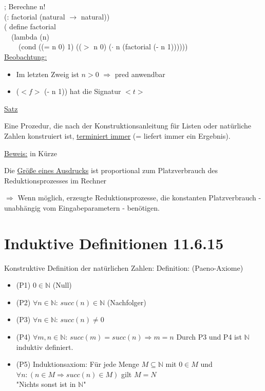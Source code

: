 \documentclass[a4paper, 20pt, openany]{book}
\begin{document}
; Berechne n! \\
(: factorial (natural $\rightarrow$ natural)) \\
( define factorial \\
\ \ (lambda (n)  \\
\ \ \ \ (cond ((= n 0) 1) (($>$ n 0) ($\cdot$ n (factorial (- n 1)))))) \\

\underline{Beobachtung:}

\begin{itemize}
  \item Im letzten Zweig ist $n>0$ $\Rightarrow$ pred anwendbar 
  \item ($<f>$ (- n 1)) hat die Signatur $<t>$
\end{itemize}

\underline{Satz}

Eine Prozedur, die nach der Konstruktionsanleitung für Listen oder natürliche Zahlen konstruiert ist, \underline{terminiert immer} (= liefert immer ein Ergebnis).

\underline{Beweis:} in Kürze

Die \underline{Größe eines Ausdrucks} ist proportional zum Platzverbrauch des Reduktionsprozesses im Rechner

$\Rightarrow$ Wenn möglich, erzeugte Reduktionsprozesse, die konstanten Platzverbrauch - unabhängig vom Eingabeparametern - benötigen.




\chapter{Induktive Definitionen 11.6.15}
Konstruktive Definition der natürlichen Zahlen:
Definition: (Paeno-Axiome)\\
\begin{itemize}
\item (P1) $0 \in \mathbb{N}$							(Null)
\item (P2) $\forall n \in \mathbb{N}$: $succ(n) \in \mathbb{N}$ (Nachfolger)
\item (P3) $\forall n \in \mathbb{N}$: $succ(n) \ne 0$
\item (P4) $\forall m,n \in \mathbb{N}$: $succ(m) = succ(n) \Rightarrow m = n$
Durch P3 und P4 ist $\mathbb{N}$ induktiv definiert.
\item (P5) Induktionsaxiom: Für jede Menge $M \subseteq \mathbb{N}$ mit $0 \in M$ und $\forall n: (n \in M \Rightarrow succ(n) \in M)$ gilt $M =N$\\
"Nichts sonst ist in $\mathbb{N}$"
\end{itemize}
\end{document}
